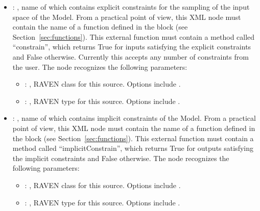 \begin{itemize}
    \item {}: ,
      name of  which contains explicit constraints for the sampling of
      the input space of the Model. From a practical point of view, this XML node must contain
      the name of a function defined in the  block (see
      Section~\ref{sec:functions}).               This external function must contain a method
      called ``constrain'', which returns True for               inputs satisfying the explicit
      constraints and False otherwise. \nb Currently this accepts any number of constraints from the
      user.
      The  node recognizes the following parameters:
        \begin{itemize}
          \item {}: ,
            RAVEN class for this source. Options include .
          \item {}: ,
            RAVEN type for this source. Options include .
      \end{itemize}

    \item {}: ,
      name of  which contains implicit constraints of the Model. From a practical
      point of view, this XML node must contain the name of a function defined in the
                     block (see Section~\ref{sec:functions}). This external
      function must contain a method called               ``implicitConstrain'', which returns True
      for outputs satisfying the implicit constraints and False otherwise.
      The  node recognizes the following parameters:
        \begin{itemize}
          \item {}: ,
            RAVEN class for this source. Options include .
          \item {}: ,
            RAVEN type for this source. Options include .
      \end{itemize}


\end{itemize}
